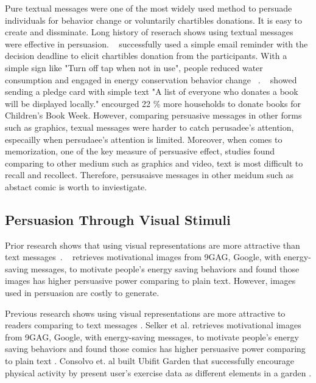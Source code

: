 Pure textual messages were one of the most widely used method to persuade individuals for behavior change or voluntarily chartibles donations. It is easy to create and dissminate. Long history of reserach shows using textual messages were effective in persuasion. ~\textcite{damgaard2017now} successfully used a simple email reminder with the decision deadline to elicit chartibles donation from the participants. With a simple sign like "Turn off tap when not in use", people reduced water consumption and engaged in energy conservation behavior change ~\cite{mckenzie2011fostering}. ~\textcite{cotterill2010impact} showed sending a pledge card with simple text "A list of everyone who donates a book will be displayed locally." encourged 22 \% more households to donate books for Children's Book Week. However, comparing persuasive messages in other forms such as graphics, texual messages were harder to catch perusadee's attention, especailly when persudaee's attention is limited. Moreover, when comes to memorization, one of the key measure of persuasive effect, studies found comparing to other medium such as graphics and video, text is most difficult to recall and recollect. Therefore, persusaisve messages in other meidum such as abstact comic is worth to inviestigate. 

\subsection{Persuasion Through Visual Stimuli}
Prior research shows that using visual representations are more attractive than text messages~\textcite{selker2015sweetbuildinggreeter,consolvo2008activity}. ~\textcite{selker2015sweetbuildinggreeter} retrieves motivational images from 9GAG, Google, with energy-saving messages, to motivate people's energy saving behaviors and found those images has higher persuasive power comparing to plain text. However, images used in persuasion are costly to generate. 


Previous research shows using visual representations are more attractive to readers comparing to text messages \cite{selker2015sweetbuildinggreeter,consolvo2008activity}. Selker et al. retrieves motivational images from 9GAG, Google, with energy-saving messages, to motivate people's energy saving behaviors and found those comics has higher persuasive power comparing to plain text \cite{selker2015sweetbuildinggreeter}. Consolvo et. al built Ubifit Garden that successfully encourage physical activity by present user's exercise data as different elements in a garden \cite{consolvo2008activity}.



